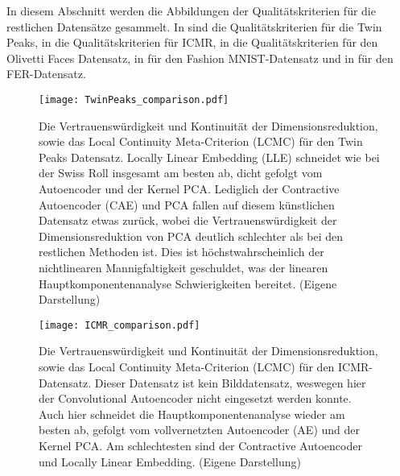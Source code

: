In diesem Abschnitt werden die Abbildungen der Qualitätskriterien für die restlichen Datensätze
gesammelt. In  sind die Qualitätskriterien für die Twin Peaks, in
 die Qualitätskriterien für ICMR, in  die
Qualitätskriterien für den Olivetti Faces Datensatz, in  für den
Fashion MNIST-Datensatz und in  für den FER-Datensatz.
\begin{figure}[ht]
	\begin{center}
		\texttt{[image: TwinPeaks\_comparison.pdf]}
	\end{center}
	\caption[Qualitätskriterien für die Twin Peaks]{Die Vertrauenswürdigkeit und Kontinuität der Dimensionsreduktion, sowie das Local Continuity Meta-Criterion (LCMC) für den Twin Peaks Datensatz. Locally Linear Embedding (LLE) schneidet wie bei der Swiss Roll insgesamt am besten ab, dicht gefolgt vom Autoencoder und der Kernel PCA. Lediglich der Contractive Autoencoder (CAE) und PCA fallen auf diesem künstlichen Datensatz etwas zurück, wobei die Vertrauenswürdigkeit der Dimensionsreduktion von PCA deutlich schlechter als bei den restlichen Methoden ist. Dies ist höchstwahrscheinlich der nichtlinearen Mannigfaltigkeit geschuldet, was der linearen Hauptkomponentenanalyse Schwierigkeiten bereitet. (Eigene Darstellung)}
	\label{fig:TwinPeaksMetrics}
\end{figure}

\begin{figure}[ht]
	\begin{center}
		\texttt{[image: ICMR\_comparison.pdf]}
	\end{center}
	\caption[Qualitätskriterien für den ICMR-Datensatz]{Die Vertrauenswürdigkeit und Kontinuität der Dimensionsreduktion, sowie das Local Continuity Meta-Criterion (LCMC) für den ICMR-Datensatz. Dieser Datensatz ist kein Bilddatensatz, weswegen hier der Convolutional Autoencoder nicht eingesetzt werden konnte. Auch hier schneidet die Hauptkomponentenanalyse wieder am besten ab, gefolgt vom vollvernetzten Autoencoder (AE) und der Kernel PCA. Am schlechtesten sind der Contractive Autoencoder und Locally Linear Embedding. (Eigene Darstellung)}
	\label{fig:ICMRMetrics}
\end{figure}

